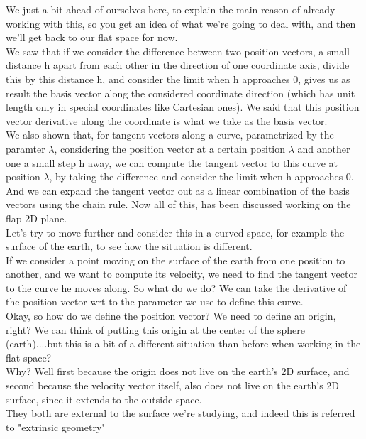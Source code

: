We just a bit ahead of ourselves here, to explain the main reason of already working with this, so you get an idea
of what we're going to deal with, and then we'll get back to our flat space for now.\\

We saw that if we consider the difference between two position vectors, a small distance h apart from each other in the direction of one coordinate axis, 
divide this by this distance h, and consider the limit when h approaches 0, gives us as result the basis vector along the considered
coordinate direction (which has unit length only in special coordinates like Cartesian ones). We said that this position vector derivative along the coordinate is what we take as the basis vector.\\

We also shown that, for tangent vectors along a curve, parametrized by the paramter $\lambda$, considering the position vector at a certain position $\lambda$ and another
one a small step h away, we can compute the tangent vector to this curve at position $\lambda$, by taking the difference and consider the limit when h approaches 0.\\

And we can expand the tangent vector out as a linear combination of the basis vectors using the chain rule.
Now all of this, has been discussed working on the flap 2D plane.\\

Let's try to move further and consider this in a curved space, for example the surface of the earth, to see how the situation is different.\\

If we consider a point moving on the surface of the earth from one position to another, and we want to compute 
its velocity, we need to find the tangent vector to the curve he moves along. So what do we do? We can take 
the derivative of the position vector wrt to the parameter we use to define this curve.\\
Okay, so how do we define the position vector? We need to define an origin, right? We can think of putting this origin at the center
of the sphere (earth)....but this is a bit of a different situation than before when working in the flat space?\\

Why? Well first because the origin does not live on the earth's 2D surface, and second because the velocity vector itself, 
also does not live on the earth's 2D surface, since it extends to the outside space.\\
They both are external to the surface we're studying, and indeed this is referred to "extrinsic geometry"

